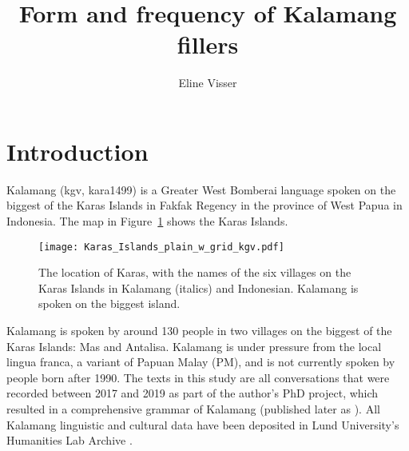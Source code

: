 \documentclass[output=paper,colorlinks,citecolor=brown
\ChapterDOI{10.5281/zenodo.15697587}
]{langscibook}
\author{Eline Visser\orcid{0000-0001-8131-2302}\affiliation{Uppsala University}}
\title{Form and frequency of Kalamang fillers}
\begin{document}
\maketitle
\graphicspath{{figures/visser}}

\section{Introduction}
\label{sec:intr}
Kalamang (kgv, kara1499) is a Greater West Bomberai language \citep{usher2021} spoken on the biggest of the Karas Islands in Fakfak Regency in the province of West Papua in Indonesia. The map in Figure~\ref{fig:map} shows the Karas Islands.

\begin{figure}[p]
	\texttt{[image: Karas\_Islands\_plain\_w\_grid\_kgv.pdf]}
	\caption{The location of Karas, with the names of the six villages on the Karas Islands in Kalamang (italics) and Indonesian. Kalamang is spoken on the biggest island.}\label{fig:map}
\end{figure}

Kalamang is spoken by around 130 people in two villages on the biggest of the Karas Islands: Mas and Antalisa. Kalamang is under pressure from the local lingua franca, a variant of Papuan Malay (PM), and is not currently spoken by people born after 1990. The texts in this study are all conversations that were recorded between 2017 and 2019 as part of the author's PhD project, which resulted in a comprehensive grammar of Kalamang (published later as \citealt{visser2022}). All Kalamang linguistic and cultural data have been deposited in Lund University's Humanities Lab Archive \citep{vissercorpus}. 



\end{document}
